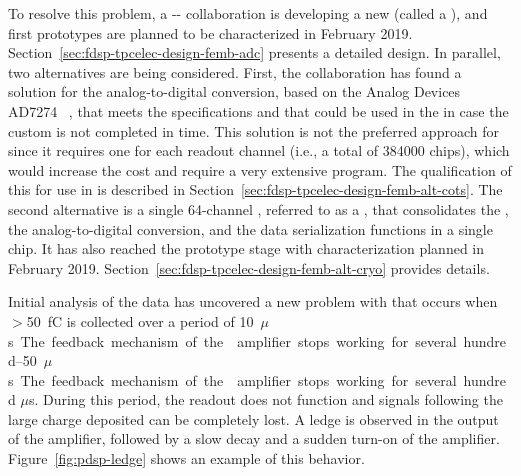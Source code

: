 To resolve this problem, a  -- collaboration is developing a new   (called a 
 ), and first
prototypes are planned to be characterized in February 2019. %
Section~\ref{sec:fdsp-tpcelec-design-femb-adc} presents a detailed design.  In parallel, two
alternatives are being considered. %
First, the  
collaboration has found %
a  
solution for the analog-to-digital conversion, based on the Analog 
Devices~\cite{AnalogDevices} AD7274~\cite{AD7274} , that meets 
the  specifications %
and that could be used in the  in %
case  the custom  is not %
completed in time. %
This 
solution is not the preferred approach for  since it
requires one  for each readout channel (i.e., a total
of \num{384000} chips), which would increase the cost %
and %
require a very extensive  program. The qualification
of this   for use in  is described
in Section~\ref{sec:fdsp-tpcelec-design-femb-alt-cots}. 
The second alternative is a single \num{64}-channel , referred to as a ,
that consolidates the , the analog-to-digital conversion, and the
data serialization functions %
in a single chip. %
It has also reached the prototype stage with  %
characterization planned in February 2019. %
Section~\ref{sec:fdsp-tpcelec-design-femb-alt-cryo} provides details.

Initial analysis of the  data has uncovered %
a new problem 
with  %
that occurs when %
$>$\SI{50}{fC} is collected over a period of \SIrange{10}{50}{$\mu$s}.
The feedback mechanism of the  amplifier 
stops working for %
several hundred $\mu$s.  %
During this period, the readout does not function %
and signals following 
the large charge deposited can %
be completely lost. A ledge is observed 
in the output of the  amplifier, followed by a slow decay 
and a sudden turn-on of the amplifier. %
Figure~\ref{fig:pdsp-ledge} shows an example of this behavior.

